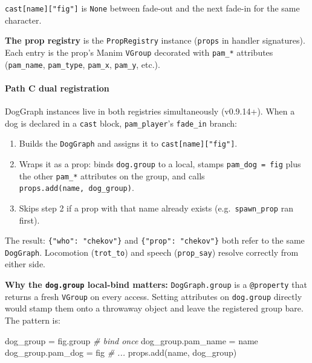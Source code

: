 \documentclass[
  11pt,
]{book}
\newenvironment{Shaded}{}{}
\newcommand{\CommentTok}[1]{\textcolor[rgb]{0.38,0.63,0.69}{\textit{#1}}}
\newcommand{\NormalTok}[1]{#1}
\newcommand{\OperatorTok}[1]{\textcolor[rgb]{0.40,0.40,0.40}{#1}}
\providecommand{\tightlist}{%
  \setlength{\itemsep}{0pt}\setlength{\parskip}{0pt}}
\begin{document}
\texttt{cast{[}name{]}{[}"fig"{]}} is \texttt{None} between fade-out and
the next fade-in for the same character.

\textbf{The prop registry} is the \texttt{PropRegistry} instance
(\texttt{props} in handler signatures). Each entry is the prop's Manim
\texttt{VGroup} decorated with \texttt{pam\_*} attributes
(\texttt{pam\_name}, \texttt{pam\_type}, \texttt{pam\_x},
\texttt{pam\_y}, etc.).

\paragraph{Path C dual registration}\label{path-c-dual-registration}

DogGraph instances live in both registries simultaneously (v0.9.14+).
When a dog is declared in a \texttt{cast} block, \texttt{pam\_player}'s
\texttt{fade\_in} branch:

\begin{enumerate}
\def\labelenumi{\arabic{enumi}.}
\tightlist
\item
  Builds the \texttt{DogGraph} and assigns it to
  \texttt{cast{[}name{]}{[}"fig"{]}}.
\item
  Wraps it as a prop: binds \texttt{dog.group} to a local, stamps
  \texttt{pam\_dog\ =\ fig} plus the other \texttt{pam\_*} attributes on
  the group, and calls \texttt{props.add(name,\ dog\_group)}.
\item
  Skips step 2 if a prop with that name already exists
  (e.g.~\texttt{spawn\_prop} ran first).
\end{enumerate}

The result: \texttt{\{"who":\ "chekov"\}} and
\texttt{\{"prop":\ "chekov"\}} both refer to the same \texttt{DogGraph}.
Locomotion (\texttt{trot\_to}) and speech (\texttt{prop\_say}) resolve
correctly from either side.

\textbf{Why the \texttt{dog.group} local-bind matters:}
\texttt{DogGraph.group} is a \texttt{@property} that returns a fresh
\texttt{VGroup} on every access. Setting attributes on
\texttt{dog.group} directly would stamp them onto a throwaway object and
leave the registered group bare. The pattern is:

\begin{Shaded}
\begin{Highlighting}[]
\NormalTok{dog\_group }\OperatorTok{=}\NormalTok{ fig.group     }\CommentTok{\# bind once}
\NormalTok{dog\_group.pam\_name }\OperatorTok{=}\NormalTok{ name}
\NormalTok{dog\_group.pam\_dog  }\OperatorTok{=}\NormalTok{ fig}
\CommentTok{\# ...}
\NormalTok{props.add(name, dog\_group)}
\end{Highlighting}
\end{Shaded}
\end{document}
